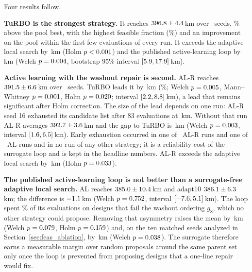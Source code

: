 \begin{table}[htbp]
\centering\small
\caption{Headline comparisons of best feasible range after 287 evaluations. Welch and Mann--Whitney tests are two-sided; Holm correction is applied over the \NvNfamily\ rows; M--W is the Mann--Whitney test; the interval is a percentile bootstrap on the difference of means; $P(A{>}B)$ is the share of run pairs in which $A$ ends above $B$.}
\label{tab:tests}

\end{table}

Four results follow.

\textbf{TuRBO is the strongest strategy.} It reaches $396.8 \pm 4.4$\,km over \NvNTurbo\ seeds, \NvGainPctTurbo\% above the pool best, with the highest feasible fraction (\NvValidTurbo\%) and an improvement on the pool within the first few evaluations of every run. It exceeds the adaptive local search by \NvDTurbovAdapt\,km (Holm $p < 0.001$) and the published active-learning loop by \NvDTurbovAL\,km (Welch $p = 0.004$, bootstrap 95\% interval $[5.9, 17.9]$\,km).

\textbf{Active learning with the washout repair is second.} AL-R reaches $391.5 \pm 6.6$\,km over \NvNALR\ seeds. TuRBO leads it by \NvDTurbovALR\,km (\NvPctTurbovALR\%; Welch $p = 0.005$, Mann--Whitney $p = 0.001$, Holm $p = 0.020$; interval $[2.2, 8.8]$\,km), a lead that remains significant after Holm correction. The size of the lead depends on one run: AL-R seed 16 exhausted its candidate list after 83 evaluations at \NvMinALR\,km. Without that run AL-R averages $392.7 \pm 3.6$\,km and the gap to TuRBO is \NvDTurbovALRc\,km (Welch $p = 0.003$, interval $[1.6, 6.5]$\,km). Early exhaustion occurred in one of \NvNALR\ AL-R runs and one of \NvNAL\ AL runs and in no run of any other strategy; it is a reliability cost of the surrogate loop and is kept in the headline numbers. AL-R exceeds the adaptive local search by \NvDALRvAdapt\,km (Holm $p = 0.033$).

\textbf{The published active-learning loop is not better than a surrogate-free adaptive local search.} AL reaches $385.0 \pm 10.4$\,km and adapt10 $386.1 \pm 6.3$\,km; the difference is $-1.1$\,km (Welch $p = 0.752$, interval $[-7.6, 5.1]$\,km). The loop spent \NvWashAL\% of its evaluations on designs that fail the washout ordering $g_8$, which no other strategy could propose. Removing that asymmetry raises the mean by \NvDALRvAL\,km (Welch $p = 0.079$, Holm $p = 0.159$) and, on the ten matched seeds analyzed in Section~\ref{sec:feas_ablation}, by \NvDALRtenvALrep\,km (Welch $p = 0.038$). The surrogate therefore earns a measurable margin over random proposals around the same parent set only once the loop is prevented from proposing designs that a one-line repair would fix.

